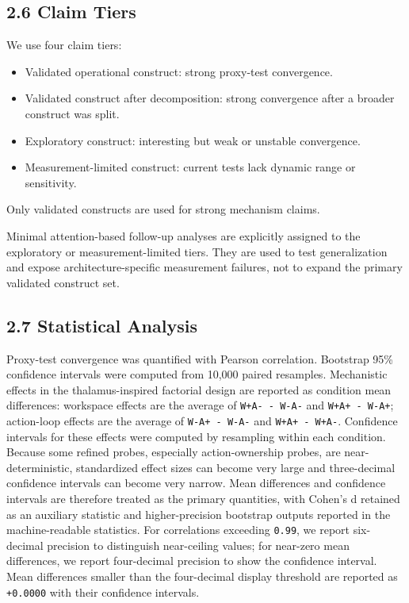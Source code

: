 \documentclass[
  11pt,
  letterpaper,
]{article}
\providecommand{\tightlist}{%
  \setlength{\itemsep}{0pt}\setlength{\parskip}{0pt}}
\begin{document}
\subsection{2.6 Claim Tiers}\label{claim-tiers}

We use four claim tiers:

\begin{itemize}
\tightlist
\item
  Validated operational construct: strong proxy-test convergence.
\item
  Validated construct after decomposition: strong convergence after a
  broader construct was split.
\item
  Exploratory construct: interesting but weak or unstable convergence.
\item
  Measurement-limited construct: current tests lack dynamic range or
  sensitivity.
\end{itemize}

Only validated constructs are used for strong mechanism claims.

Minimal attention-based follow-up analyses are explicitly assigned to
the exploratory or measurement-limited tiers. They are used to test
generalization and expose architecture-specific measurement failures,
not to expand the primary validated construct set.

\subsection{2.7 Statistical Analysis}\label{statistical-analysis}

Proxy-test convergence was quantified with Pearson correlation.
Bootstrap 95\% confidence intervals were computed from 10,000 paired
resamples. Mechanistic effects in the thalamus-inspired factorial design
are reported as condition mean differences: workspace effects are the
average of \texttt{W+A-\ -\ W-A-} and \texttt{W+A+\ -\ W-A+};
action-loop effects are the average of \texttt{W-A+\ -\ W-A-} and
\texttt{W+A+\ -\ W+A-}. Confidence intervals for these effects were
computed by resampling within each condition. Because some refined
probes, especially action-ownership probes, are near-deterministic,
standardized effect sizes can become very large and three-decimal
confidence intervals can become very narrow. Mean differences and
confidence intervals are therefore treated as the primary quantities,
with Cohen's d retained as an auxiliary statistic and higher-precision
bootstrap outputs reported in the machine-readable statistics. For
correlations exceeding \texttt{0.99}, we report six-decimal precision to
distinguish near-ceiling values; for near-zero mean differences, we
report four-decimal precision to show the confidence interval. Mean
differences smaller than the four-decimal display threshold are reported
as \texttt{+0.0000} with their confidence intervals.
\end{document}
